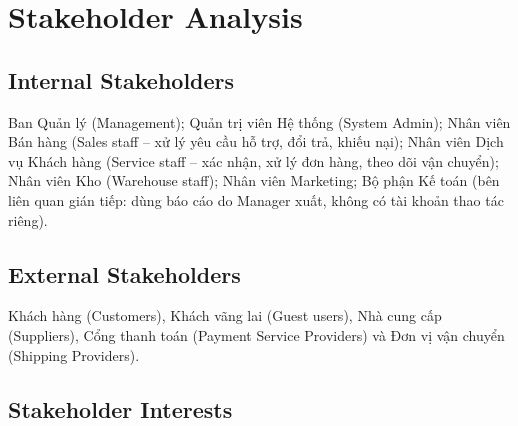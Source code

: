 \documentclass[12pt,a4paper,oneside]{report}
\begin{document}
\section{Stakeholder Analysis}

\subsection{Internal Stakeholders}

Ban Quản lý (Management); Quản trị viên Hệ thống (System Admin); Nhân viên Bán hàng (Sales staff -- xử lý yêu cầu hỗ trợ, đổi trả, khiếu nại); Nhân viên Dịch vụ Khách hàng (Service staff -- xác nhận, xử lý đơn hàng, theo dõi vận chuyển); Nhân viên Kho (Warehouse staff); Nhân viên Marketing; Bộ phận Kế toán (bên liên quan gián tiếp: dùng báo cáo do Manager xuất, không có tài khoản thao tác riêng).

\subsection{External Stakeholders}

Khách hàng (Customers), Khách vãng lai (Guest users), Nhà cung cấp (Suppliers), Cổng thanh toán (Payment Service Providers) và Đơn vị vận chuyển (Shipping Providers).

\subsection{Stakeholder Interests}
\end{document}
